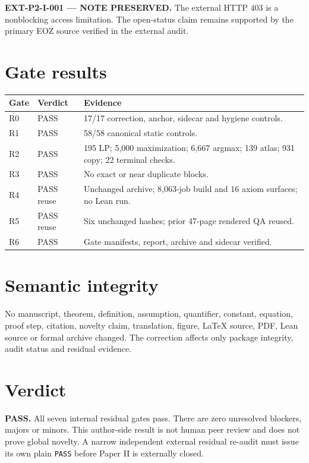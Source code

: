 \documentclass[11pt]{article}
\begin{document}
\textbf{EXT-P2-I-001 --- NOTE PRESERVED.} The external HTTP 403 is a
nonblocking access limitation. The open-status claim remains supported by the
primary EOZ source verified in the external audit.

\section{Gate results}
\small
\begin{longtable}{p{.08\linewidth}p{.18\linewidth}p{.65\linewidth}}
\toprule Gate & Verdict & Evidence \\ \midrule
R0 & PASS & 17/17 correction, anchor, sidecar and hygiene controls. \\
R1 & PASS & 58/58 canonical static controls. \\
R2 & PASS & 195 LP; 5,000 maximization; 6,667 argmax; 139 atlas; 931 copy; 22 terminal checks. \\
R3 & PASS & No exact or near duplicate blocks. \\
R4 & PASS reuse & Unchanged archive; 8,063-job build and 16 axiom surfaces; no Lean run. \\
R5 & PASS reuse & Six unchanged hashes; prior 47-page rendered QA reused. \\
R6 & PASS & Gate manifests, report, archive and sidecar verified. \\
\bottomrule
\end{longtable}
\normalsize

\section{Semantic integrity}
No manuscript, theorem, definition, assumption, quantifier, constant, equation,
proof step, citation, novelty claim, translation, figure, LaTeX source, PDF,
Lean source or formal archive changed. The correction affects only package
integrity, audit status and residual evidence.

\section{Verdict}
\textbf{PASS.} All seven internal residual gates pass. There are zero unresolved
blockers, majors or minors. This author-side result is not human peer review and
does not prove global novelty. A narrow independent external residual re-audit
must issue its own plain \texttt{PASS} before Paper II is externally closed.
\end{document}
